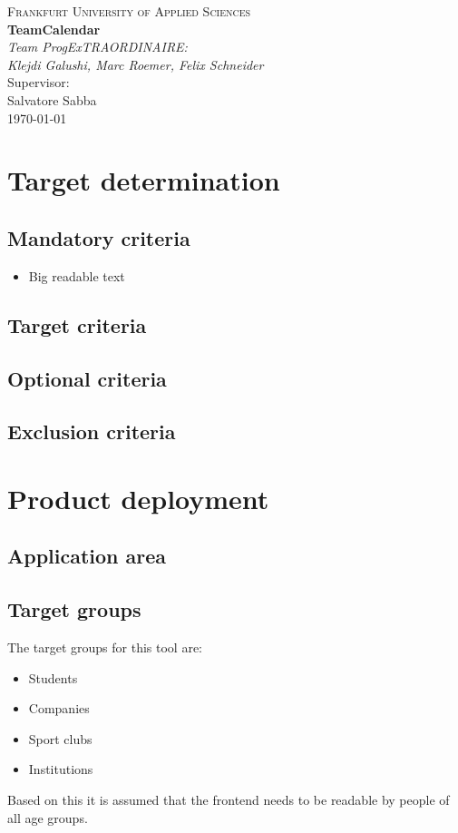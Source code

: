 \documentclass[]{article}
\begin{document}
	\begin{titlepage}
		\centering
		\vspace*{0cm}
		{\scshape\Large Frankfurt University of Applied Sciences}\\[3cm]
		{\huge\bfseries TeamCalendar}\\[8cm]
		{\Large\itshape Team ProgExTRAORDINAIRE:}\\
		{\Large\itshape Klejdi Galushi, Marc Roemer, Felix Schneider}\\[3cm]
		Supervisor:\\
		Salvatore Sabba\\[1cm]
		{\large \today}
	\end{titlepage}
	\newpage
	\tableofcontents
	\newpage
	
\section{Target determination}
	\subsection{Mandatory criteria}
		\begin{itemize}
			\item Big readable text
		\end{itemize}
	\subsection{Target criteria}
	\subsection{Optional criteria}
	\subsection{Exclusion criteria}
\section{Product deployment}
	\subsection{Application area}
	\subsection{Target groups}
		The target groups for this tool are:
		\begin{itemize}
			\item Students
			\item Companies
			\item Sport clubs
			\item Institutions
		\end{itemize}
		Based on this it is assumed that the frontend needs to be readable by people of all age groups.
\end{document}
